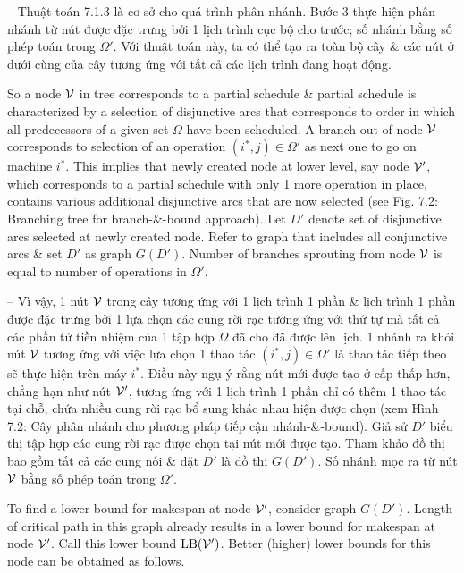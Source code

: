 \documentclass{article}
\begin{document}
\begin{itemize}
\begin{itemize}
        -- Thuật toán 7.1.3 là cơ sở cho quá trình phân nhánh. Bước 3 thực hiện phân nhánh từ nút được đặc trưng bởi 1 lịch trình cục bộ cho trước; số nhánh bằng số phép toán trong $\Omega'$. Với thuật toán này, ta có thể tạo ra toàn bộ cây \& các nút ở dưới cùng của cây tương ứng với tất cả các lịch trình đang hoạt động.

        So a node ${\cal V}$ in tree corresponds to a partial schedule \& partial schedule is characterized by a selection of disjunctive arcs that corresponds to order in which all predecessors of a given set $\Omega$ have been scheduled. A branch out of node ${\cal V}$ corresponds to selection of an operation $(i^*,j)\in\Omega'$ as next one to go on machine $i^*$. This implies that newly created node at lower level, say node ${\cal V}'$, which corresponds to a partial schedule with only 1 more operation in place, contains various additional disjunctive arcs that are now selected (see {\sf Fig. 7.2: Branching tree for branch-\&-bound approach}). Let $D'$ denote set of disjunctive arcs selected at newly created node. Refer to graph that includes all conjunctive arcs \& set $D'$ as graph $G(D')$. Number of branches sprouting from node ${\cal V}$ is equal to number of operations in $\Omega'$.

        -- Vì vậy, 1 nút ${\cal V}$ trong cây tương ứng với 1 lịch trình 1 phần \& lịch trình 1 phần được đặc trưng bởi 1 lựa chọn các cung rời rạc tương ứng với thứ tự mà tất cả các phần tử tiền nhiệm của 1 tập hợp $\Omega$ đã cho đã được lên lịch. 1 nhánh ra khỏi nút ${\cal V}$ tương ứng với việc lựa chọn 1 thao tác $(i^*,j)\in\Omega'$ là thao tác tiếp theo sẽ thực hiện trên máy $i^*$. Điều này ngụ ý rằng nút mới được tạo ở cấp thấp hơn, chẳng hạn như nút ${\cal V}'$, tương ứng với 1 lịch trình 1 phần chỉ có thêm 1 thao tác tại chỗ, chứa nhiều cung rời rạc bổ sung khác nhau hiện được chọn (xem {\sf Hình 7.2: Cây phân nhánh cho phương pháp tiếp cận nhánh-\&-bound}). Giả sử $D'$ biểu thị tập hợp các cung rời rạc được chọn tại nút mới được tạo. Tham khảo đồ thị bao gồm tất cả các cung nối \& đặt $D'$ là đồ thị $G(D')$. Số nhánh mọc ra từ nút ${\cal V}$ bằng số phép toán trong $\Omega'$.

        To find a lower bound for makespan at node ${\cal V}'$, consider graph $G(D')$. Length of critical path in this graph already results in a lower bound for makespan at node ${\cal V}'$. Call this lower bound ${\rm LB}({\cal V}')$. Better (higher) lower bounds for this node can be obtained as follows.


\end{itemize}
\end{itemize}
\end{document}
